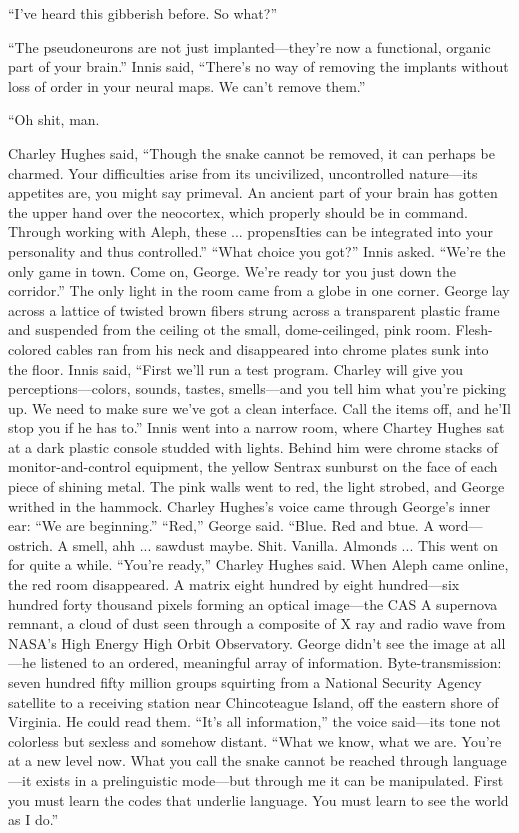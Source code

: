 ``I've heard this gibberish before. So what?''

``The pseudoneurons are not just implanted—they're now a functional, organic part of your brain.''
Innis said, ``There's no way of removing the implants without loss of order in your neural maps. We can't remove them.''

``Oh shit, man.

Charley Hughes said, ``Though the snake cannot be removed, it can perhaps be charmed. Your difficulties arise from its uncivilized, uncontrolled nature—its appetites are, you might say primeval. An ancient part of your brain has gotten the upper hand over the neocortex, which properly should be in command. Through working with Aleph, these ... propensIties can be integrated into your personality and thus controlled.''
``What choice you got?'' Innis asked. ``We're the only game in town. Come on, George. We're ready tor you just down the corridor.''
The only light in the room came from a globe in one corner. George lay across a lattice of twisted brown fibers strung across a transparent plastic frame and suspended from the ceiling ot the small, dome-ceilinged, pink room. Flesh-colored cables ran from his neck and disappeared into chrome plates sunk into the floor.
Innis said, ``First we'll run a test program. Charley will give you perceptions—colors, sounds, tastes, smells—and you tell him what you're picking up. We need to make sure we've got a clean interface. Call the items off, and he'Il stop you if he has to.''
Innis went into a narrow room, where Chartey Hughes sat at a dark plastic console studded with lights. Behind him were chrome stacks of monitor-and-control equipment, the yellow Sentrax sunburst on the face of each piece of shining metal.
The pink walls went to red, the light strobed, and George writhed in the hammock. Charley Hughes's voice came through George's inner ear: ``We are beginning.''
``Red,'' George said. ``Blue. Red and btue. A word—ostrich. A smell, ahh ... sawdust maybe. Shit. Vanilla. Almonds ...
This went on for quite a while. ``You're ready,'' Charley Hughes said.
When Aleph came online, the red room disappeared. A matrix eight hundred by eight hundred—six hundred forty thousand pixels forming an optical image—the CAS A supernova remnant, a cloud of dust seen through a composite of X ray and radio wave from NASA's High Energy High Orbit Observatory. George didn't see the image at all—he listened to an ordered, meaningful array of information.
Byte-transmission: seven hundred fifty million groups squirting from a National Security Agency satellite to a receiving station near Chincoteague Island, off the eastern shore of Virginia. He could read them.
``It's all information,'' the voice said—its tone not colorless but sexless and somehow distant. ``What we know, what we are. You're at a new level now. What you call the snake cannot be reached through language—it exists in a prelinguistic mode—but through me it can be manipulated. First you must learn the codes that underlie language. You must learn to see the world as I do.''

